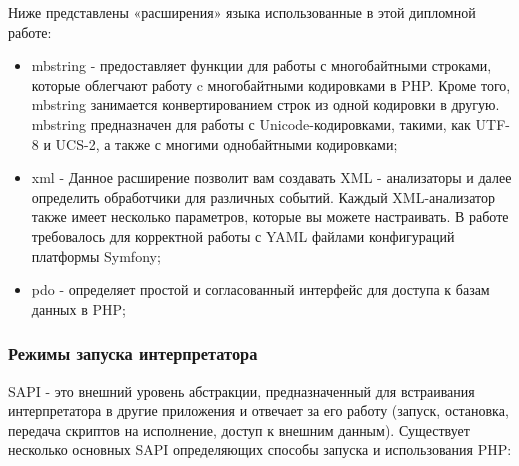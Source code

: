 Ниже представлены «расширения» языка использованные в этой дипломной работе:
\begin{itemize}
  \item mbstring - предоставляет функции для работы с многобайтными строками, которые облегчают работу c многобайтными кодировками в PHP. Кроме того, mbstring занимается конвертированием строк из одной кодировки в другую. mbstring предназначен для работы с Unicode-кодировками, такими, как UTF-8 и UCS-2, а также с многими однобайтными кодировками;
  \item xml - Данное расширение позволит вам создавать XML - анализаторы и далее определить обработчики для различных событий. Каждый XML-анализатор также имеет несколько параметров, которые вы можете настраивать. В работе требовалось для корректной работы с YAML файлами конфигураций платформы Symfony;
  \item pdo - определяет простой и согласованный интерфейс для доступа к базам данных в PHP;
\end{itemize}

\subsubsection{Режимы запуска интерпретатора }
\label{sub:practice:extebtions_php}

SAPI - это внешний уровень абстракции, предназначенный для встраивания интерпретатора в другие приложения и отвечает за его работу (запуск, остановка, передача скриптов на исполнение, доступ к внешним данным). Существует несколько основных SAPI определяющих способы запуска и использования PHP:

